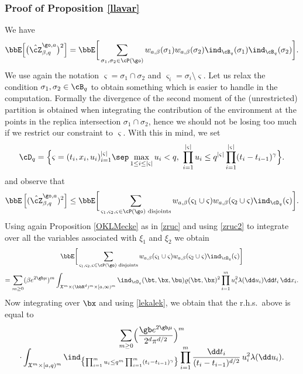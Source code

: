 \subsubsection{Proof of Proposition \ref{llavar}}

We have
\begin{equation}
\label{eq:Zcarre}
\bbE \Bigl[ \bigl(\hat \cZ^{\go,a}_{\beta,q} \bigr)^2 \Bigr]=\bbE \bigg[ \sum_{\sigma_1, \sigma_2 \in \cP(\go)} w_{a,\beta}(\sigma_1)w_{a,\beta}(\sigma_2) \ind_{\cB_q}(\sigma_1)\ind_{\cB_q}(\sigma_2) \bigg].
\end{equation}
We use again the notation $\varsigma= \sigma_1\cap \sigma_2$ and $\varsigma_i=\sigma_i\setminus \varsigma$. Let us relax the condition $\sigma_1,\sigma_2\in \cB_q$ to obtain something which is easier to handle in the computation. Formally the divergence of the second moment of the (unrestricted) partition is obtained when integrating the contribution of the environment at the points in the replica intersection $\sigma_1\cap \sigma_2$, hence we should not be losing too much if we restrict our constraint to $\varsigma$.
With this in mind, we set
\[
\cD_q = \Bigl\{ \varsigma = (t_i,x_i,u_i)_{i=1}^{|\varsigma|} \sep \max_{1\leq i\leq |\varsigma|}u_i < q, \ \prod_{i=1}^{|\varsigma|} u_i \leq q^{|\varsigma|}\prod_{i=1}^{|\varsigma|} (t_{i}-t_{i-1})^{\gamma} \Bigr\}.
\]
and observe that
\begin{equation}
\bbE \left[ (\hat \cZ^{\go,a}_{\beta,q})^2 \right]\le\bbE \bigg[ \sum_{\varsigma_1, \varsigma_2,\varsigma \in \cP(\go) \text{ disjoints}} w_{a,\beta}(\varsigma_1\cup \varsigma)w_{a,\beta}(\varsigma_2\cup\varsigma) \ind_{\cD_q}(\varsigma) \bigg].
\end{equation}
Using again Proposition \ref{OKLMecke} as in \eqref{zruc} and using \eqref{zruc2}
to integrate over all the variables associated with $\xi_1$ and $\xi_2$ we obtain
\begin{multline}
\label{avantlasdx}
\bbE \bigg[ \sum_{\varsigma_1, \varsigma_2,\varsigma \in \cP(\go) \text{ disjoints}} w_{a,\beta}(\varsigma_1\cup \varsigma)w_{a,\beta}(\varsigma_2\cup\varsigma) \ind_{\cD_q}(\varsigma) \bigg]\\
= \sum_{m \ge 0} (\beta e^{2\gb \mu})^{m} \int_{\mathfrak{X}^m \times (\bbR^d)^m \times [a,\infty)^m} \ind_{\cD_q}(\bt,\bx,\bu)
\varrho(\bt,\bx)^2 \prod_{i=1}^m
u_i^2 \lambda(\dd u_i) \dd t_i\,\dd x_i.
\end{multline}
Now integrating over $\bx$ and using \eqref{lekalek}, we obtain that the r.h.s.\ above is equal to
\begin{multline}\label{lasdx}
\sum_{m \ge 0} \Bigl(\frac{\gb e^{2\gb \mu}}{ 2^d\pi^{d/2}} \Bigr)^{m}\\[-8pt]
\cdot\int_{ \mathfrak{X}^m \times [a,q)^m} \ind_{\bigl\{\prod_{i=1}^m u_i\le q^m \prod_{i=1}^m (t_i-t_{i-1})^{\gamma}\bigr\}}\prod_{i=1}^m
\frac{\dd t_i}{(t_i-t_{i-1})^{d/2}}\, u^2_i \lambda(\dd u_i).
\end{multline}

